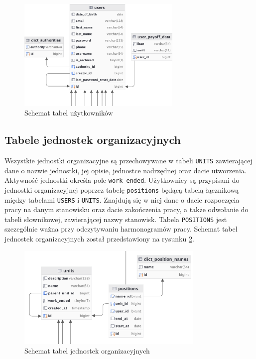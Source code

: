 \begin{figure}[H]
    \centering
    \includegraphics[width=0.7\textwidth]{graf/usersTable.png}
    \caption{Schemat tabel użytkowników}
    \label{fig:usersTable}
\end{figure}

\subsection{Tabele jednostek organizacyjnych}

Wszystkie jednostki organizacyjne są przechowywane w tabeli \texttt{UNITS} zawierającej dane o nazwie jednostki, jej opisie, jednostce nadrzędnej oraz dacie utworzenia. Aktywność jednostki określa pole \texttt{work\_ended}. Użytkownicy są przypisani do jednostki organizacyjnej poprzez tabelę \texttt{positions} będącą tabelą łącznikową między tabelami \texttt{USERS} i \texttt{UNITS}. Znajdują się w niej dane o dacie rozpoczęcia pracy na danym stanowisku oraz dacie zakończenia pracy, a także odwołanie do tabeli słownikowej, zawierającej nazwy stanowisk. Tabela \texttt{POSITIONS} jest szczególnie ważna przy odczytywaniu harmonogramów pracy. Schemat tabel jednostek organizacyjnych został przedstawiony na rysunku \ref{fig:organizationalUnitsTable}.

\begin{figure}[H]
    \centering
    \includegraphics[width=0.8\textwidth]{graf/unitsTable.png}
    \caption{Schemat tabel jednostek organizacyjnych}
    \label{fig:organizationalUnitsTable}
\end{figure}

